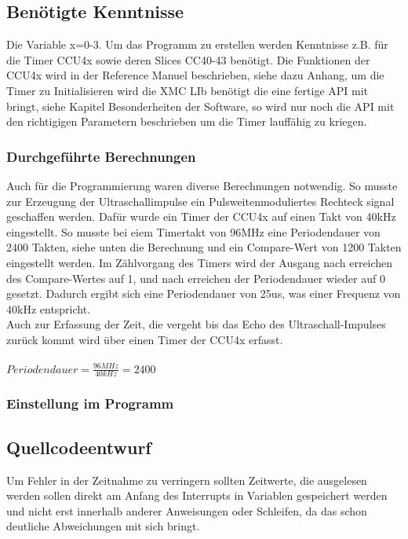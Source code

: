 \subsection{Benötigte Kenntnisse}
Die Variable x=0-3.
Um das Programm zu erstellen werden Kenntnisse z.B. für die Timer CCU4x sowie deren Slices CC40-43 benötigt. Die Funktionen der CCU4x wird in der Reference Manuel beschrieben, siehe dazu Anhang, um die Timer zu Initialisieren wird die XMC LIb benötigt die eine fertige API mit bringt, siehe Kapitel Besonderheiten der Software, so wird nur noch die API mit den richtigigen Parametern beschrieben um die Timer lauffähig zu kriegen. 

\subsubsection{Durchgeführte Berechnungen}
Auch für die Programmierung waren diverse Berechnungen notwendig. So musste zur Erzeugung der Ultraschallimpulse ein Pulsweitenmoduliertes Rechteck signal geschaffen werden. Dafür wurde ein Timer der CCU4x auf einen Takt von 40kHz eingestellt. So musste bei eiem Timertakt von 96MHz eine Periodendauer von 2400 Takten, siehe unten die Berechnung und ein Compare-Wert von 1200 Takten eingestellt werden. Im Zählvorgang des Timers wird der Ausgang nach erreichen des Compare-Wertes auf 1, und nach erreichen der Periodendauer wieder auf 0 gesetzt. Dadurch ergibt sich eine Periodendauer von 25us, was einer Frequenz von 40kHz entspricht.\\
Auch zur Erfassung der Zeit, die vergeht bis das Echo des Ultraschall-Impulses zurück kommt wird über einen Timer der CCU4x erfasst. 
\onehalfspacing \\ \\
\(\displaystyle Periodendauer=\frac{96MHz}{40kHz} = 2400 \) 
\singlespacing
\subsubsection{Einstellung im Programm}

\subsection{Quellcodeentwurf}
Um Fehler in der Zeitnahme zu verringern sollten Zeitwerte, die ausgelesen werden sollen direkt am Anfang des Interrupts in Variablen gespeichert werden und nicht erst innerhalb anderer Anweisungen oder Schleifen, da das schon deutliche Abweichungen mit sich bringt.\\

